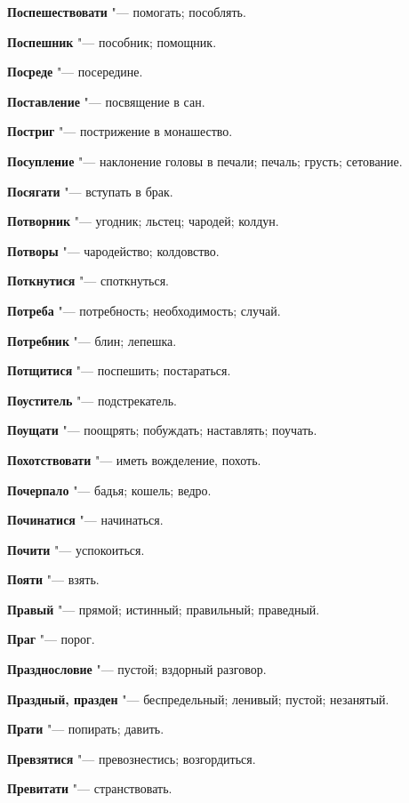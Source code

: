 \begin{mymulticols}
\noindent\textbf{Поспешествовати} "--- помогать; пособлять. 

\noindent\textbf{Поспешник} "--- пособник; помощник. 

\noindent\textbf{Посреде} "--- посередине. 

\noindent\textbf{Поставление} "--- посвящение в сан. 

\noindent\textbf{Постриг} "--- пострижение в монашество. 

\noindent\textbf{Посупление} "--- наклонение головы в печали; печаль; грусть; сетование. 

\noindent\textbf{Посягати} "--- вступать в брак. 

\noindent\textbf{Потворник} "--- угодник; льстец; чародей; колдун. 

\noindent\textbf{Потворы} "--- чародейство; колдовство. 

\noindent\textbf{Поткнутися} "--- споткнуться. 

\noindent\textbf{Потреба} "--- потребность; необходимость; случай. 

\noindent\textbf{Потребник} "--- блин; лепешка. 

\noindent\textbf{Потщитися} "--- поспешить; постараться. 

\noindent\textbf{Поуститель} "--- подстрекатель. 

\noindent\textbf{Поущати} "--- поощрять; побуждать; наставлять; поучать. 

\noindent\textbf{Похотствовати} "--- иметь вожделение, похоть. 

\noindent\textbf{Почерпало} "--- бадья; кошель; ведро. 

\noindent\textbf{Починатися} "--- начинаться. 

\noindent\textbf{Почити} "--- успокоиться. 

\noindent\textbf{Пояти} "--- взять. 

\noindent\textbf{Правый} "--- прямой; истинный; правильный; праведный. 

\noindent\textbf{Праг} "--- порог. 

\noindent\textbf{Празднословие} "--- пустой; вздорный разговор. 

\noindent\textbf{Праздный, празден} "--- беспредельный; ленивый; пустой; незанятый. 

\noindent\textbf{Прати} "--- попирать; давить. 

\noindent\textbf{Превзятися} "--- превознестись; возгордиться. 

\noindent\textbf{Превитати} "--- странствовать. 


\end{mymulticols}
